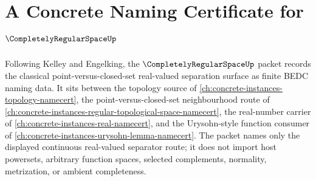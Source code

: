 \chapter{A Concrete Naming Certificate for $\CompletelyRegularSpaceUp$}
\label{ch:concrete-instances-completely-regular-space-namecert}

Following Kelley and Engelking, the $\CompletelyRegularSpaceUp$ packet records the classical point-versus-closed-set real-valued separation surface as finite BEDC naming data. It sits between the topology source of \autoref{ch:concrete-instances-topology-namecert}, the point-versus-closed-set neighbourhood route of \autoref{ch:concrete-instances-regular-topological-space-namecert}, the real-number carrier of \autoref{ch:concrete-instances-real-namecert}, and the Urysohn-style function consumer of \autoref{ch:concrete-instances-urysohn-lemma-namecert}. The packet names only the displayed continuous real-valued separator route; it does not import host powersets, arbitrary function spaces, selected complements, normality, metrization, or ambient completeness.

